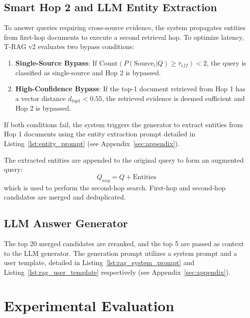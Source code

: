 \documentclass[conference]{IEEEtran}
\begin{document}
\subsection{Smart Hop 2 and LLM Entity Extraction}
To answer queries requiring cross-source evidence, the system propagates entities from first-hop documents to execute a second retrieval hop. To optimize latency, T-RAG v2 evaluates two bypass conditions:
\begin{enumerate}
    \item \textbf{Single-Source Bypass}: If $\text{Count}(P(\text{Source}_i | Q) \geq \tau_{eff}) < 2$, the query is classified as single-source and Hop 2 is bypassed.
    \item \textbf{High-Confidence Bypass}: If the top-1 document retrieved from Hop 1 has a vector distance $d_{top1} < 0.55$, the retrieved evidence is deemed sufficient and Hop 2 is bypassed.
\end{enumerate}
If both conditions fail, the system triggers the generator to extract entities from Hop 1 documents using the entity extraction prompt detailed in Listing~\ref{lst:entity_prompt} (see Appendix~\ref{sec:appendix}).

The extracted entities are appended to the original query to form an augmented query:
\begin{equation}
    Q_{aug} = Q + \text{Entities}
\end{equation}
which is used to perform the second-hop search. First-hop and second-hop candidates are merged and deduplicated.

\subsection{LLM Answer Generator}
The top 20 merged candidates are reranked, and the top 5 are passed as context to the LLM generator. The generation prompt utilizes a system prompt and a user template, detailed in Listing~\ref{lst:rag_system_prompt} and Listing~\ref{lst:rag_user_template} respectively (see Appendix~\ref{sec:appendix}).

\section{Experimental Evaluation}
\end{document}
